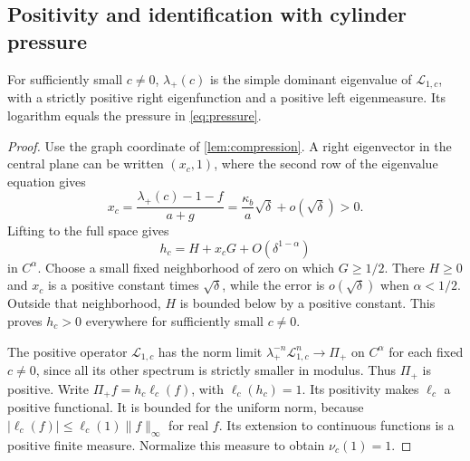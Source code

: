 \documentclass[11pt,a4paper]{article}
\numberwithin{equation}{section}
\theoremstyle{definition}
\theoremstyle{remark}
\newcommand{\Lop}{\mathcal L}
\newcommand{\Proj}{\Pi}
\begin{document}
\subsection{Positivity and identification with cylinder pressure}
\begin{lemma}
\label{lem:positive-pressure}
For sufficiently small $c\ne0$, $\lambda_+(c)$ is the simple dominant
eigenvalue of $\Lop_{1,c}$, with a strictly positive right eigenfunction
and a positive left eigenmeasure. Its logarithm equals the pressure in
\cref{eq:pressure}.
\end{lemma}
\begin{proof}
Use the graph coordinate of \cref{lem:compression}. A right eigenvector
in the central plane can be written $(x_c,1)$, where the second row of
the eigenvalue equation gives
\begin{equation}
 x_c=\frac{\lambda_+(c)-1-f}{a+g}
     =\frac{\kappa_b}{a}\sqrt\delta+o(\sqrt\delta)>0.
 \label{eq:x-leading}
\end{equation}
Lifting to the full space gives
\begin{equation}
 h_c=H+x_cG+O(\delta^{1-\alpha})
 \label{eq:h-lift}
\end{equation}
in $C^\alpha$. Choose a small fixed neighborhood of zero on which
$G\ge1/2$. There $H\ge0$ and $x_c$ is a positive constant times
$\sqrt\delta$, while the error is $o(\sqrt\delta)$ when $\alpha<1/2$.
Outside that neighborhood, $H$ is bounded below by a positive constant.
This proves $h_c>0$ everywhere for sufficiently small $c\ne0$.

The positive operator $\Lop_{1,c}$ has the norm limit
$\lambda_+^{-n}\Lop_{1,c}^n\to\Proj_+$ on $C^\alpha$ for each fixed
$c\ne0$, since all its other spectrum is strictly smaller in modulus.
Thus $\Proj_+$ is positive. Write $\Proj_+f=h_c\ell_c(f)$, with
$\ell_c(h_c)=1$. Its positivity makes $\ell_c$ a positive functional.
It is bounded for the uniform norm, because
$|\ell_c(f)|\le\ell_c(1)\|f\|_\infty$ for real $f$.
Its extension to continuous functions is a positive finite measure.
Normalize this measure to obtain $\nu_c(1)=1$.


\end{proof}
\end{document}
